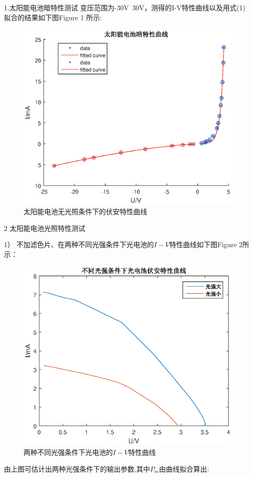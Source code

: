 ﻿\documentclass[10.5pt]{article}
\begin{document}
\subsection{\textbf{}}


1.太阳能电池暗特性测试
变压范围为-30V~30V，测得的I-V特性曲线以及用式(1)拟合的结果如下图Figure 1 所示:
\begin{figure}[!ht]
\centering
\caption{太阳能电池无光照条件下的伏安特性曲线}
\includegraphics[width=400pt]{DimCharacteristic.eps}
\end{figure}

2 太阳能电池光照特性测试

1） 不加滤色片、在两种不同光强条件下光电池的$I-V$特性曲线如下图Figure 2所示：
\begin{figure}[!ht]
\centering
\caption{两种不同光强条件下光电池的$I-V$特性曲线}
\includegraphics[width=350pt]{CurrentVoltageCurve.eps}
\end{figure}
由上图可估计出两种光强条件下的输出参数,其中$P_m$由曲线拟合算出:
\newpage
\end{document}
